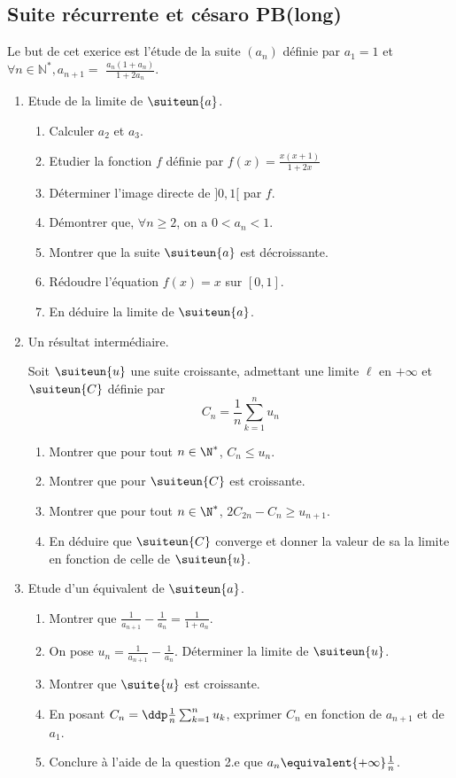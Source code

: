 \subsection{Suite récurrente et césaro PB(long)}
\begin{exercice}
Le but de cet exerice est l'étude de  la suite $\left(a_{n}\right)$ définie par $a_{1}=1$ et $\forall n \in \mathbb{N}^{*}, a_{n+1}=$ $\frac{a_{n}\left(1+a_{n}\right)}{1+2 a_{n}} .$

\begin{enumerate}
\item Etude de la limite de $\suiteun{a}$.
\begin{enumerate}

\item  Calculer $a_{2}$ et $a_{3}$.
\item Etudier la fonction $f$ définie par  $f(x) =\frac{x(x+1)}{1+2x}$
\item Déterminer l'image directe de $]0,1[$ par $f$. 
\item  Démontrer que, $\forall n \geqslant 2$, on a $0<a_{n}<1$.
\item Montrer que la suite $\suiteun{a}$ est décroissante.
\item Rédoudre l'équation $f(x)=x$ sur $[0,1]$. 
\item En déduire la limite de $\suiteun{a}$.
\end{enumerate}
\item Un résultat intermédiaire. 

Soit $\suiteun{u} $ une suite croissante, admettant une limite $\ell$ en $+\infty$ et $\suiteun{C}$ définie par 
$$C_n=\frac{1}{n}\sum_{k=1}^n  u_n$$
\begin{enumerate}
\item Montrer que pour tout $n\in \N^*$, $C_n\leq u_n$. 
\item Montrer que pour $\suiteun{C}$ est croissante. 
\item Montrer que pour tout $n\in \N^*$, $2C_{2n}-C_n \geq u_{n+1}$. 
\item En déduire que $\suiteun{C}$ converge et donner la valeur de sa  la limite en fonction de celle de $\suiteun{u}$. 

\end{enumerate}
\item Etude d'un équivalent de $\suiteun{a}$.
\begin{enumerate}
\item Montrer que $\frac{1}{a_{n+1}}-\frac{1}{a_{n}}=\frac{1}{1+a_{n}}$.
\item On pose $u_{n}=\frac{1}{a_{n+1}}-\frac{1}{a_{n}} .$ Déterminer la limite de $\suiteun{u}$.
\item Montrer que $\suite{u}$ est croissante. 
\item En posant $C_{n}=\ddp \frac{1}{n} \sum_{k=1}^{n} u_{k}$, exprimer $C_{n}$ en fonction de $a_{n+1}$ et de $a_{1}$.
\item Conclure à l'aide de la question 2.e que $a_n \equivalent{+\infty} \frac{1}{n}$.
\end{enumerate}
\end{enumerate}


\end{exercice}

